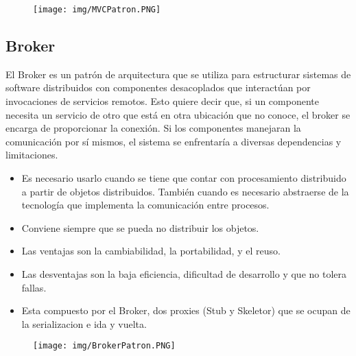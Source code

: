 \begin{figure}[!htb]
    \centering
    \texttt{[image: img/MVCPatron.PNG]}
\end{figure}

\subsection*{Broker}
El Broker es un patrón de arquitectura que se utiliza para estructurar sistemas de software distribuidos con componentes desacoplados que interactúan por invocaciones de servicios remotos. Esto quiere decir que, si un componente necesita un servicio de otro que está en otra ubicación que no conoce, el broker se encarga de proporcionar la conexión. Si los componentes manejaran la comunicación por sí mismos, el sistema se enfrentaría a diversas dependencias y limitaciones.
\begin{itemize}
\item Es necesario usarlo cuando se tiene que contar con procesamiento distribuido a partir de objetos distribuidos. También cuando es necesario abstraerse de la tecnología que implementa la comunicación entre procesos.
\item Conviene siempre que se pueda no distribuir los objetos.
\item Las ventajas son la cambiabilidad, la portabilidad, y el reuso.
\item Las desventajas son la baja eficiencia, dificultad de desarrollo y que no tolera fallas.
\item Esta compuesto por el Broker, dos proxies (Stub y Skeletor) que se ocupan de la serializacion e ida y vuelta.
\end{itemize}

\begin{figure}[!htb]
    \centering
    \texttt{[image: img/BrokerPatron.PNG]}
\end{figure}






